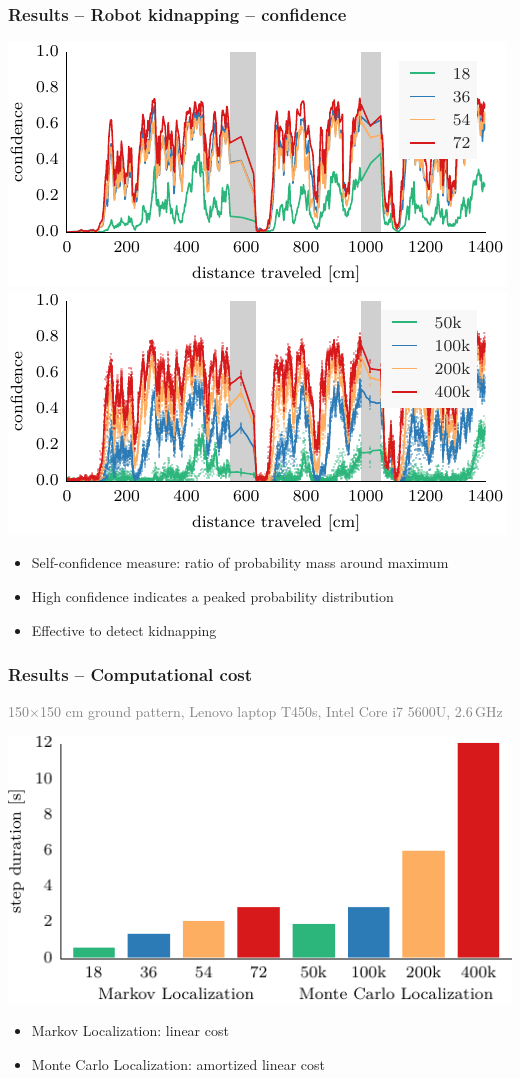 \documentclass[lualatex,aspectratio=169,xcolor=dvipsnames,10pt,c]{beamer}
\begin{document}
\frame
{
	\frametitle{Results – Robot kidnapping – confidence}
	
	
	\hfill
	
	{\footnotesize
	\makebox[.5\textwidth][c]{\textcolor{gray}{varying number of discretization angles}}\hfill
	\makebox[.5\textwidth][c]{\textcolor{gray}{varying number of particles}}
	}
	
	\includegraphics[width=.48\columnwidth]{ml-whole_random_long-conf} \hfill
	\includegraphics[width=.48\columnwidth]{mcl-whole_random_long-conf}
	
	\vspace{1em}

	\begin{itemize}
	\item Self-confidence measure: ratio of probability mass around maximum
	\item High confidence indicates a peaked probability distribution
	\item Effective to detect kidnapping
	\end{itemize}
}

\frame
{
	\frametitle{Results – Computational cost}
	
	\begin{center}
	{\small \textcolor{gray}{150$\times$150 cm ground pattern, Lenovo laptop T450s, Intel Core i7 5600U, 2.6\,GHz}}
	
	\vspace{.5em}
	
	\includegraphics[width=.65\columnwidth]{cpu_load}
	\end{center}
	
	\begin{itemize}
	\item Markov Localization: linear cost
	\item Monte Carlo Localization: amortized linear cost
	\end{itemize}
}
\end{document}
